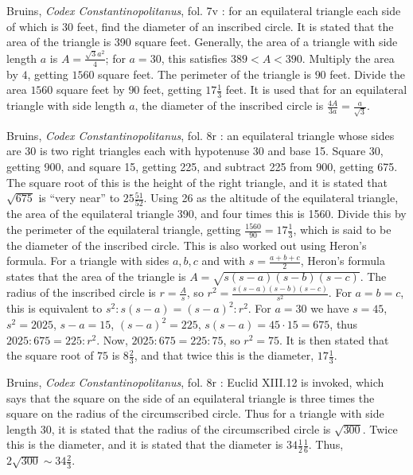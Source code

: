 \documentclass{article}
\theoremstyle{definition}
\begin{document}
Bruins, {\em Codex Constantinopolitanus}, fol. 7v \cite[p.~9]{constantinopolitanus}:
for an equilateral triangle each side of which is 30 feet, 
find the diameter of an inscribed circle.
It is stated that the area of the  triangle is 390 square feet.
Generally, the area of a triangle with side length $a$ is $A=\frac{\sqrt{3} a^2}{4}$; for
$a=30$, this satisfies $389<A<390$.
Multiply the area by $4$, getting $1560$ square feet. The perimeter of the triangle is 
$90$ feet. 
Divide the area $1560$ square feet by $90$ feet, getting $17 \frac{1}{3}$ feet. 
It is used that for an equilateral triangle with side length $a$, 
the diameter of the inscribed circle is
$\frac{4A}{3a} = \frac{a}{\sqrt{3}}$.

Bruins, {\em Codex Constantinopolitanus}, fol. 8r \cite[p.~10]{constantinopolitanus}:
 an equilateral triangle whose sides are 30 is  two right triangles each with hypotenuse 30 and base 15.
Square 30, getting 900, and square 15, getting 225, and subtract 225 from 900, getting 675.
The square root of this is the height of the right triangle, and it is stated that $\sqrt{675}$ is ``very near'' to
$25 \frac{51}{52}$. Using 26 as the altitude of the equilateral triangle, the area of the equilateral triangle
390, and four times this is 1560. Divide this by the perimeter of the equilateral triangle, getting $\frac{1560}{90}=17 \frac{1}{3}$,
which is said to be the diameter of the inscribed circle.
This is also worked out using Heron's formula.
For a triangle with sides $a,b,c$ and with $s=\frac{a+b+c}{2}$, Heron's formula states that the area of the triangle is 
$A=\sqrt{s(s-a)(s-b)(s-c)}$.
The radius of the inscribed circle is $r=\frac{A}{s}$, so $r^2 = \frac{s(s-a)(s-b)(s-c)}{s^2}$. 
For $a=b=c$,  this is equivalent to $s^2:s(s-a)  = (s-a)^2:r^2$. For $a=30$ we have 
$s=45$, $s^2=2025$, $s-a=15$,  $(s-a)^2=225$, $s(s-a) = 45 \cdot 15 = 675$, thus
$2025:675 = 225:r^2$. Now, $2025:675 = 225:75$, so $r^2=75$. It is then stated that the square root of $75$ is
$8 \frac{2}{3}$, and that twice this is the diameter, $17 \frac{1}{3}$. 

Bruins, {\em Codex Constantinopolitanus}, fol. 8r \cite[p.~12]{constantinopolitanus}:
Euclid XIII.12 is invoked, which says that the square on the side of an equilateral triangle is three times the square on the radius of the circumscribed circle.
Thus for a triangle with side length 30, it is stated that the radius of the circumscribed circle is $\sqrt{300}$. 
Twice this is the diameter, and it is stated that the diameter is $34 \frac{1}{2} \frac{1}{6}$. 
Thus, $2 \sqrt{300} \sim 34 \frac{2}{3}$.  
\end{document}
